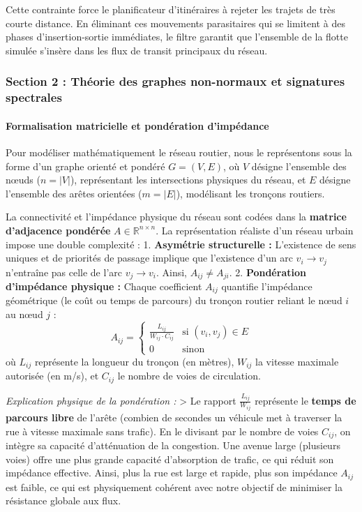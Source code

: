 \documentclass[10pt, a4paper]{article}
\begin{document}
Cette contrainte force le planificateur d'itinéraires à rejeter les
trajets de très courte distance. En éliminant ces mouvements
parasitaires qui se limitent à des phases d'insertion-sortie immédiates,
le filtre garantit que l'ensemble de la flotte simulée s'insère dans les
flux de transit principaux du réseau.

\subsubsection{Section 2 : Théorie des graphes non-normaux et signatures
spectrales}\label{section-2-thuxe9orie-des-graphes-non-normaux-et-signatures-spectrales}

\paragraph{Formalisation matricielle et pondération
d'impédance}\label{formalisation-matricielle-et-ponduxe9ration-dimpuxe9dance}

Pour modéliser mathématiquement le réseau routier, nous le représentons
sous la forme d'un graphe orienté et pondéré \(G = (V, E)\), où \(V\)
désigne l'ensemble des nœuds (\(n = |V|\)), représentant les
intersections physiques du réseau, et \(E\) désigne l'ensemble des
arêtes orientées (\(m = |E|\)), modélisant les tronçons routiers.

La connectivité et l'impédance physique du réseau sont codées dans la
\textbf{matrice d'adjacence pondérée} \(A \in \mathbb{R}^{n \times n}\).
La représentation réaliste d'un réseau urbain impose une double
complexité : 1. \textbf{Asymétrie structurelle :} L'existence de sens
uniques et de priorités de passage implique que l'existence d'un arc
\(v_i \to v_j\) n'entraîne pas celle de l'arc \(v_j \to v_i\). Ainsi,
\(A_{ij} \neq A_{ji}\). 2. \textbf{Pondération d'impédance physique :}
Chaque coefficient \(A_{ij}\) quantifie l'impédance géométrique (le coût
ou temps de parcours) du tronçon routier reliant le nœud \(i\) au nœud
\(j\) :
\[A_{ij} = \begin{cases} \frac{L_{ij}}{W_{ij} \cdot C_{ij}} & \text{si } (v_i, v_j) \in E \\ 0 & \text{sinon} \end{cases}\]
où \(L_{ij}\) représente la longueur du tronçon (en mètres), \(W_{ij}\)
la vitesse maximale autorisée (en m/s), et \(C_{ij}\) le nombre de voies
de circulation.

\emph{Explication physique de la pondération :} \textgreater{} Le
rapport \(\frac{L_{ij}}{W_{ij}}\) représente le \textbf{temps de
parcours libre} de l'arête (combien de secondes un véhicule met à
traverser la rue à vitesse maximale sans trafic). En le divisant par le
nombre de voies \(C_{ij}\), on intègre sa capacité d'atténuation de la
congestion. Une avenue large (plusieurs voies) offre une plus grande
capacité d'absorption de trafic, ce qui réduit son impédance effective.
Ainsi, plus la rue est large et rapide, plus son impédance \(A_{ij}\)
est faible, ce qui est physiquement cohérent avec notre objectif de
minimiser la résistance globale aux flux.
\end{document}
